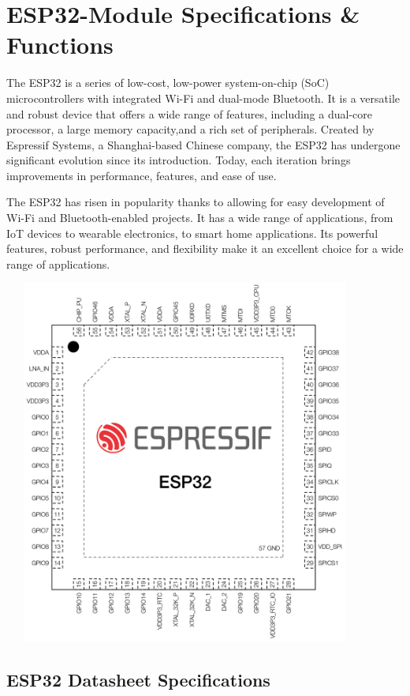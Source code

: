 \documentclass[a4paper]{report}
\begin{document}
{\section{ESP32-Module Specifications \& Functions}
The ESP32 is a series of low-cost, low-power system-on-chip (SoC) microcontrollers with integrated Wi-Fi and dual-mode Bluetooth. It is a versatile and robust device that offers a wide range of features, including a dual-core processor, a large memory capacity,and a rich set of peripherals.
Created by Espressif Systems, a Shanghai-based Chinese company, the ESP32 has undergone significant evolution since its introduction. Today, each iteration brings improvements in performance, features, and ease of use.

The ESP32 has risen in popularity thanks to allowing for easy development of Wi-Fi and Bluetooth-enabled projects. It has a wide range of applications, from IoT devices to wearable electronics, to smart home applications. Its powerful features, robust performance, and flexibility make it an excellent choice for a wide range of applications.
\begin{center}
    \includegraphics[width=12cm, height=12cm]{esp32.png}
\end{center}
\subsection{ESP32 Datasheet Specifications}

}
\end{document}
